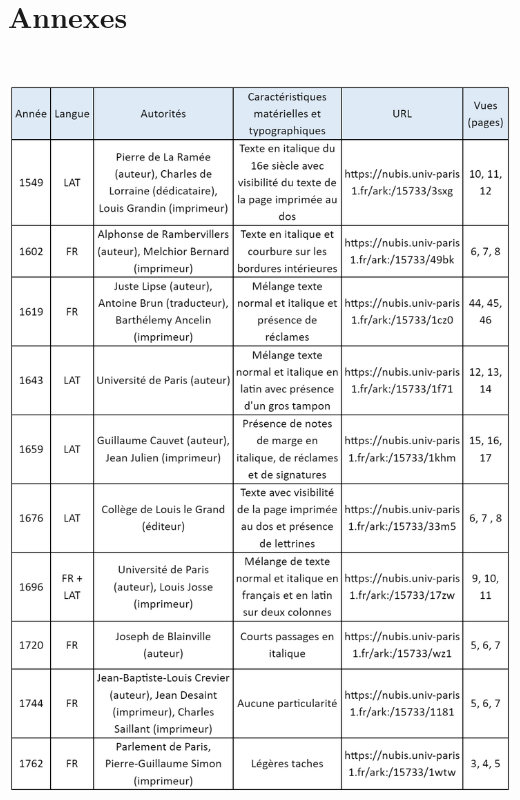 \documentclass[a4paper,12pt,twoside]{book}
\begin{document}
\newpage{\pagestyle{empty}\cleardoublepage}
	







\appendix %

\chapter*{Annexes}


\includegraphics[width=6in,height=8in]{vertopal_157ae480aa4a4b07be198b586a812241/media/image21.png}
\end{document}
